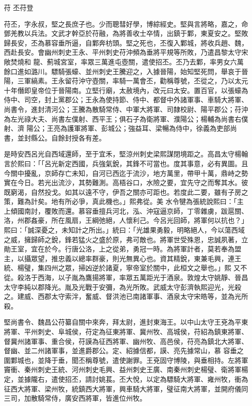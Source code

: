 
\begin{pinyinscope}

 苻
 丕苻登



 苻丕，字永叔，堅之長庶子也。少而聰彗好學，博綜經史。堅與言將略，嘉之，命鄧羌教以兵法。文武才幹亞於苻融，為將善收士卒情，出鎮于鄴，東夏安之。堅敗歸長安，丕為慕容垂所逼，自鄴奔枋頭。堅之死也，丕復入鄴城，將收兵趙、魏，西赴長安。會幽州刺史王永、平州刺史苻沖頻為垂將平規等所敗，乃遣昌黎太守宋敞焚燒和
 龍、薊城宮室，率眾三萬進屯壺關，遣使招丕。丕乃去鄴，率男女六萬餘口進如潞川。驃騎張蠔、並州刺史王騰迎之，入據晉陽，始知堅死問，舉哀于晉陽，三軍縞素。王永留苻沖守壺關，率騎一萬會丕，勸稱尊號，丕從之，乃以太元十年僭即皇帝位于晉陽南。立堅行廟，太赦境內，改元曰太安。置百官，以張蠔為侍中、司空，封上黨郡公；王永為使持節、侍中、都督中外諸軍事、車騎大將軍、尚書令，進封清河公；王騰為散騎常侍、中軍大將軍、司隸校尉、陽平郡公；苻沖為左光祿大夫、尚書左僕射、西平王；俱石子為衛將軍、濮陽公；楊輔為尚書右僕射、濟
 陽公；王亮為護軍將軍、彭城公；強益耳、梁暢為侍中，徐義為吏部尚書，並封縣公。自餘封授各有差。



 是時安西呂光自西域還師，至于宜禾，堅涼州刺史梁熙謀閉境距之。高昌太守楊翰言於熙曰：「「呂光新定西國，兵強氣銳，其鋒不可當也。度其事意，必有異圖。且今關中擾亂，京師存亡未知，自河已西迄于流沙，地方萬里，帶甲十萬，鼎峙之勢實在今日。若光出流沙，其勢難測。高梧谷口，水險之要，宜先守之而奪其水。彼既窮渴，自然投戈。如其以遠不守，伊吾之關亦可距也。若度此二要，雖有子房之策，難為計矣。地有所必爭，真此機也。」熙弗從。美
 水令犍為張統說熙曰：「主上傾國南討，覆敗而還。慕容垂擅兵河北，泓、沖寇逼京師，丁零雜虜，跋扈關、洛，州郡姦豪，所在風扇，王綱弛絕，人懷利己。今呂光回師，將軍何以抗也？」熙曰：「誠深憂之，未知計之所出。」統曰：「光雄果勇毅，明略絕人，今以蕩西域之威，擁歸師之銳，鋒若猛火之盛於原，弗可敵也。將軍世受殊恩，忠誠夙著，立勛王室，宜在於今。行唐公洛，上之從弟，勇冠一時。為將軍計者，莫若奉為盟主，以攝眾望，推忠義以總率群豪，則光無異心也。資其精銳，東兼毛興，連王統、楊璧，集四州之眾，掃凶逆於諸夏，寧帝室於關中，此桓文之舉也。」熙
 又不從。殺洛于西海，以子胤為鷹揚將軍，率眾五萬距光于酒泉。敦煌太守姚靜、晉昌太守李純以郡降光。胤及光戰于安彌，為光所敗。武威太守彭濟執熙迎光，光殺之。建威、西郡太守索泮，奮威、督洪池已南諸軍事、酒泉太守宋皓等，並為光所殺。



 堅尚書令、魏昌公苻纂自關中來奔，拜太尉，進封東海王。以中山太守王兗為平東將軍、平州刺史、阜城侯，苻定為征東將軍、冀州牧、高城侯，苻紹為鎮東將軍、督冀州諸軍事、重合侯，苻謨為征西將軍、幽州牧、高邑侯，苻亮為鎮北大將軍、督幽、並二州諸軍事，並進爵郡公。定、紹據信都，謨、亮先據常山，慕
 容垂之圍鄴城也，並降于垂，聞丕稱尊號，遣使謝罪。王兗固守博陵，與垂相持。左將軍竇衝、秦州刺史王統、河州刺史毛興、益州刺史王廣、南秦州刺史楊璧、衛將軍楊定，並據隴右，遣使招丕，請討姚萇。丕大悅，以定為驃騎大將軍、雍州牧，衝為征西大將軍、梁州牧，統鎮西大將軍，興車騎大將軍，璧征南大將軍，並開府儀同三司，加散騎常侍，廣安西將軍，皆進位州牧。




\end{pinyinscope}
